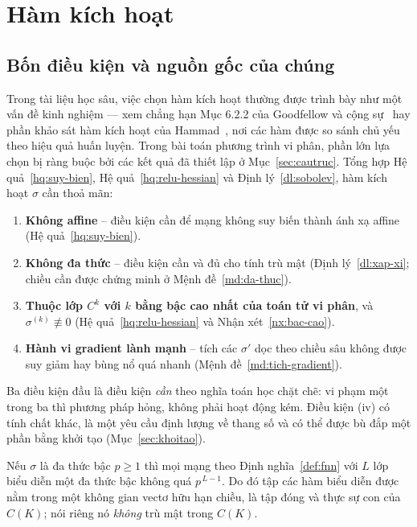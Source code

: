 \section{Hàm kích hoạt}
\label{sec:kichhoat}
 
\subsection{Bốn điều kiện và nguồn gốc của chúng}
\label{subsec:yeu-cau}
 
Trong tài liệu học sâu, việc chọn hàm kích hoạt thường được trình bày như một
vấn đề kinh nghiệm --- xem chẳng hạn Mục 6.2.2 của Goodfellow và cộng
sự~\cite{goodfellow2016} hay phần khảo sát hàm kích hoạt
của Hammad~\cite{hammad2024}, nơi các hàm được so sánh chủ yếu theo hiệu quả
huấn luyện. Trong bài toán phương trình vi phân, phần lớn lựa chọn bị
ràng buộc bởi các kết quả đã thiết lập ở Mục~\ref{sec:cautruc}. Tổng hợp Hệ
quả~\ref{hq:suy-bien}, Hệ quả~\ref{hq:relu-hessian} và Định lý~\ref{dl:sobolev},
hàm kích hoạt $\sigma$ cần thoả mãn:
 
\begin{enumerate}[label=(\roman*), leftmargin=*]
\item \textbf{Không affine} -- điều kiện cần để mạng không suy biến thành ánh xạ
      affine (Hệ quả~\ref{hq:suy-bien}).
\item \textbf{Không đa thức} -- điều kiện cần và đủ cho tính trù mật
      (Định lý~\ref{dl:xap-xi}; chiều cần được chứng minh ở
      Mệnh đề~\ref{md:da-thuc}).
\item \textbf{Thuộc lớp $C^{k}$ với $k$ bằng bậc cao nhất của toán tử vi phân},
      và $\sigma^{(k)} \not\equiv 0$ (Hệ quả~\ref{hq:relu-hessian} và
      Nhận xét~\ref{nx:bac-cao}).
\item \textbf{Hành vi gradient lành mạnh} -- tích các $\sigma'$ dọc theo chiều
      sâu không được suy giảm hay bùng nổ quá nhanh
      (Mệnh đề~\ref{md:tich-gradient}).
\end{enumerate}
 
Ba điều kiện đầu là điều kiện \emph{cần} theo nghĩa toán học chặt chẽ: vi phạm
một trong ba thì phương pháp hỏng, không phải hoạt động kém. Điều kiện (iv) có
tính chất khác, là một yêu cầu định lượng về thang số và có thể được bù đắp một
phần bằng khởi tạo (Mục~\ref{sec:khoitao}).
 
\begin{menhde}
\label{md:da-thuc}
Nếu $\sigma$ là đa thức bậc $p \ge 1$ thì mọi mạng theo
Định nghĩa~\ref{def:fnn} với $L$ lớp biểu diễn một đa thức bậc không quá
$p^{\,L-1}$. Do đó tập các hàm biểu diễn được nằm trong một không gian vectơ
hữu hạn chiều, là tập đóng và thực sự con của $C(K)$; nói riêng nó \emph{không}
trù mật trong $C(K)$.
\end{menhde}
 
